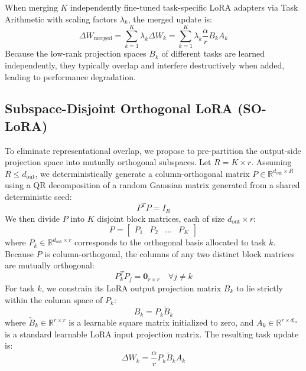 \documentclass{article}
\theoremstyle{plain}
\theoremstyle{definition}
\theoremstyle{remark}
\begin{document}
When merging $K$ independently fine-tuned task-specific LoRA adapters via Task Arithmetic with scaling factors $\lambda_k$, the merged update is:
\begin{equation}
  \Delta W_{\text{merged}} = \sum_{k=1}^K \lambda_k \Delta W_k = \sum_{k=1}^K \lambda_k \frac{\alpha}{r} B_k A_k
\end{equation}
Because the low-rank projection spaces $B_k$ of different tasks are learned independently, they typically overlap and interfere destructively when added, leading to performance degradation.

\subsection{Subspace-Disjoint Orthogonal LoRA (SO-LoRA)}

To eliminate representational overlap, we propose to pre-partition the output-side projection space into mutually orthogonal subspaces.
Let $R = K \times r$. Assuming $R \le d_{\text{out}}$, we deterministically generate a column-orthogonal matrix $P \in \mathbb{R}^{d_{\text{out}} \times R}$ using a QR decomposition of a random Gaussian matrix generated from a shared deterministic seed:
\begin{equation}
  P^T P = I_{R}
\end{equation}
We then divide $P$ into $K$ disjoint block matrices, each of size $d_{\text{out}} \times r$:
\begin{equation}
  P = \begin{bmatrix} P_1 & P_2 & \dots & P_K \end{bmatrix}
\end{equation}
where $P_k \in \mathbb{R}^{d_{\text{out}} \times r}$ corresponds to the orthogonal basis allocated to task $k$. Because $P$ is column-orthogonal, the columns of any two distinct block matrices are mutually orthogonal:
\begin{equation}
  P_k^T P_j = \mathbf{0}_{r \times r} \quad \forall j \neq k
\end{equation}
For task $k$, we constrain its LoRA output projection matrix $B_k$ to lie strictly within the column space of $P_k$:
\begin{equation}
  B_k = P_k \tilde{B}_k
\end{equation}
where $\tilde{B}_k \in \mathbb{R}^{r \times r}$ is a learnable square matrix initialized to zero, and $A_k \in \mathbb{R}^{r \times d_{\text{in}}}$ is a standard learnable LoRA input projection matrix. The resulting task update is:
\begin{equation}
  \Delta W_k = \frac{\alpha}{r} P_k \tilde{B}_k A_k
\end{equation}
\end{document}
